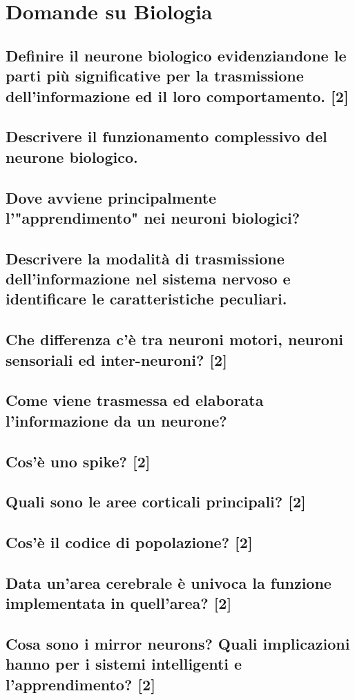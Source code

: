 \documentclass[\main/main.tex]{subfiles}
\begin{document}
\section{Domande su Biologia}
\subsection{Definire il neurone biologico evidenziandone le parti più significative per la trasmissione dell'informazione ed il loro comportamento. [2]}
\subsection{Descrivere il funzionamento complessivo del neurone biologico.}
\subsection{Dove avviene principalmente l'"apprendimento" nei neuroni biologici?}
\subsection{Descrivere la modalità di trasmissione dell'informazione nel sistema nervoso e identificare le caratteristiche peculiari.}
\subsection{Che differenza c'è tra neuroni motori, neuroni sensoriali ed inter-neuroni? [2]}
\subsection{Come viene trasmessa ed elaborata l'informazione da un neurone?}
\subsection{ Cos'è uno spike? [2]}
\subsection{ Quali sono le aree corticali principali? [2]}
\subsection{Cos'è il codice di popolazione? [2]}
\subsection{Data un'area cerebrale è univoca la funzione implementata in quell'area? [2]}
\subsection{Cosa sono i mirror neurons? Quali implicazioni hanno per i sistemi intelligenti e l’apprendimento? [2]}
\end{document}
